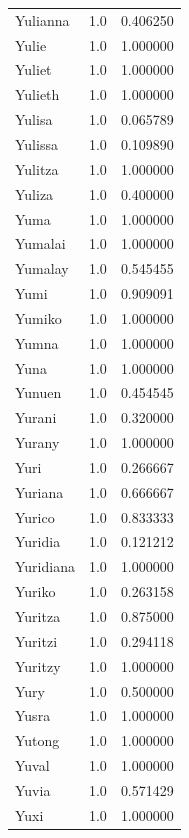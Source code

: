 \documentclass[
  letterpaper,
  DIV=11,
  numbers=noendperiod]{scrreprt}
\begin{document}
\begin{tabular}{lrr}
Yulianna        &   1.0 &   0.406250 \\
Yulie           &   1.0 &   1.000000 \\
Yuliet          &   1.0 &   1.000000 \\
Yulieth         &   1.0 &   1.000000 \\
Yulisa          &   1.0 &   0.065789 \\
Yulissa         &   1.0 &   0.109890 \\
Yulitza         &   1.0 &   1.000000 \\
Yuliza          &   1.0 &   0.400000 \\
Yuma            &   1.0 &   1.000000 \\
Yumalai         &   1.0 &   1.000000 \\
Yumalay         &   1.0 &   0.545455 \\
Yumi            &   1.0 &   0.909091 \\
Yumiko          &   1.0 &   1.000000 \\
Yumna           &   1.0 &   1.000000 \\
Yuna            &   1.0 &   1.000000 \\
Yunuen          &   1.0 &   0.454545 \\
Yurani          &   1.0 &   0.320000 \\
Yurany          &   1.0 &   1.000000 \\
Yuri            &   1.0 &   0.266667 \\
Yuriana         &   1.0 &   0.666667 \\
Yurico          &   1.0 &   0.833333 \\
Yuridia         &   1.0 &   0.121212 \\
Yuridiana       &   1.0 &   1.000000 \\
Yuriko          &   1.0 &   0.263158 \\
Yuritza         &   1.0 &   0.875000 \\
Yuritzi         &   1.0 &   0.294118 \\
Yuritzy         &   1.0 &   1.000000 \\
Yury            &   1.0 &   0.500000 \\
Yusra           &   1.0 &   1.000000 \\
Yutong          &   1.0 &   1.000000 \\
Yuval           &   1.0 &   1.000000 \\
Yuvia           &   1.0 &   0.571429 \\
Yuxi            &   1.0 &   1.000000 \\

\end{tabular}
\end{document}
